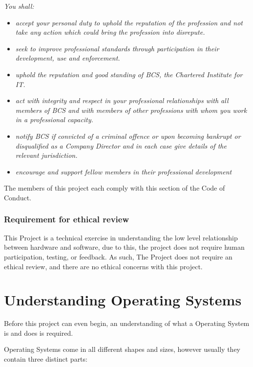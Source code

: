 \documentclass[a4paper]{report}
\begin{document}
\textit{You shall:}
\begin{itemize}
\item \textit{accept your personal duty to uphold the reputation of the profession and not take any action which could bring the profession into disrepute.}
\item \textit{seek to improve professional standards through participation in their development, use and enforcement.}
\item \textit{uphold the reputation and good standing of BCS, the Chartered Institute for IT.}
\item \textit{act with integrity and respect in your professional relationships with all members of BCS and with members of other professions with whom you work in a professional capacity.}
\item \textit{notify BCS if convicted of a criminal offence or upon becoming bankrupt or disqualified as a Company Director and in each case give details of the relevant jurisdiction.}
\item \textit{encourage and support fellow members in their professional development}
\end{itemize}

The members of this project each comply with this section of the Code of Conduct.



\subsection*{Requirement for ethical review}

This Project is a technical exercise in understanding the low level relationship between hardware and software, due to this, the project does not require human participation, testing, or feedback. As such, The Project does not require an ethical review, and there are no ethical concerns with this project.

\clearpage
\chapter*{Understanding Operating Systems}


Before this project can even begin, an understanding of what a Operating System is and does is required.

Operating Systems come in all different shapes and sizes, however usually they contain three distinct parts:
\end{document}
